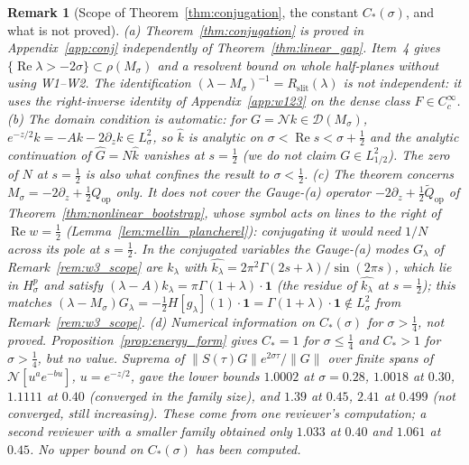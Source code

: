 \documentclass[11pt,a4paper]{article}
\newtheorem{remark}{Remark}
\begin{document}
\begin{remark}[Scope of Theorem~\ref{thm:conjugation}, the constant $C_*(\sigma)$, and what is not proved]
\label{rem:conj_scope}
(a) Theorem~\ref{thm:conjugation} is proved in Appendix~\ref{app:conj} independently of Theorem~\ref{thm:linear_gap}.
Item~4 gives $\{\operatorname{Re}\lambda>-2\sigma\}\subset\rho(M_\sigma)$ and a resolvent bound on whole half-planes without
using W1--W2.  The identification $(\lambda-M_\sigma)^{-1}=R_{\mathrm{slit}}(\lambda)$ is not independent: it uses the
right-inverse identity of Appendix~\ref{app:w123} on the dense class $\widehat{F}\in C_c^\infty$.
(b) The domain condition is automatic: for $G=\mathcal{N}k\in\mathcal{D}(M_\sigma)$, $e^{-z/2}k=-Ak-2\partial_zk\in L^2_\sigma$,
so $\widehat{k}$ is analytic on $\sigma<\operatorname{Re}s<\sigma+\tfrac12$ and the analytic continuation of $\widehat{G}=N\widehat{k}$
vanishes at $s=\tfrac12$ (we do not claim $G\in L^2_{1/2}$).
The zero of $N$ at $s=\tfrac12$ is also what confines the result to $\sigma<\tfrac12$.
(c) The theorem concerns $M_\sigma=-2\partial_z+\tfrac12Q_{\mathrm{op}}$ only.  It does not cover the Gauge-(a)
operator $-2\partial_z+\tfrac12\widetilde{Q}_{\mathrm{op}}$ of Theorem~\ref{thm:nonlinear_bootstrap}, whose symbol
acts on lines to the right of $\operatorname{Re}w=\tfrac12$ (Lemma~\ref{lem:mellin_plancherel}): conjugating it would need $1/N$ across its pole at $s=\tfrac12$.
In the conjugated variables the Gauge-(a) modes $G_\lambda$ of Remark~\ref{rem:w3_scope} are $k_\lambda$ with
$\widehat{k_\lambda}=2\pi^2\Gamma(2s+\lambda)/\sin(2\pi s)$, which lie in $H^p_\sigma$ and satisfy
$(\lambda-A)k_\lambda=\pi\Gamma(1+\lambda)\cdot\mathbf{1}$ (the residue of $\widehat{k_\lambda}$ at $s=\tfrac12$); this matches
$(\lambda-M_\sigma)G_\lambda=-\tfrac12H[g_\lambda](1)\cdot\mathbf{1}=\Gamma(1+\lambda)\cdot\mathbf{1}\notin L^2_\sigma$ from Remark~\ref{rem:w3_scope}.
(d) \emph{Numerical information on $C_*(\sigma)$ for $\sigma>\tfrac14$, not proved.}  Proposition~\ref{prop:energy_form}
gives $C_*=1$ for $\sigma\le\tfrac14$ and $C_*>1$ for $\sigma>\tfrac14$, but no value.  Suprema of
$\|S(\tau)G\|e^{2\sigma\tau}/\|G\|$ over finite spans of $\mathcal{N}[u^ae^{-bu}]$, $u=e^{-z/2}$, gave the lower bounds
$1.0002$ at $\sigma=0.28$, $1.0018$ at $0.30$, $1.1111$ at $0.40$ (converged in the family size), and $1.39$ at $0.45$,
$2.41$ at $0.499$ (not converged, still increasing).  These come from one reviewer's computation; a second reviewer with a
smaller family obtained only $1.033$ at $0.40$ and $1.061$ at $0.45$.  No upper bound on $C_*(\sigma)$ has been computed.

\end{remark}
\end{document}
